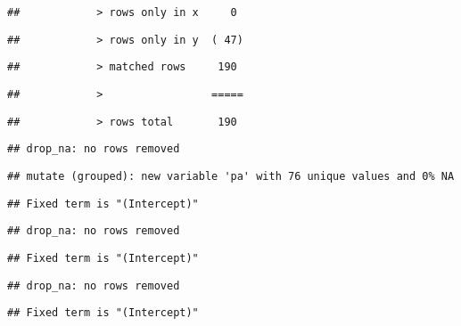 \documentclass[
]{article}
\newenvironment{Shaded}{\begin{snugshade}}{\end{snugshade}}
\newcommand{\DataTypeTok}[1]{\textcolor[rgb]{0.13,0.29,0.53}{#1}}
\newcommand{\KeywordTok}[1]{\textcolor[rgb]{0.13,0.29,0.53}{\textbf{#1}}}
\newcommand{\NormalTok}[1]{#1}
\newcommand{\OperatorTok}[1]{\textcolor[rgb]{0.81,0.36,0.00}{\textbf{#1}}}
\newcommand{\StringTok}[1]{\textcolor[rgb]{0.31,0.60,0.02}{#1}}
\begin{document}
\begin{verbatim}
##            > rows only in x     0
\end{verbatim}

\begin{verbatim}
##            > rows only in y  ( 47)
\end{verbatim}

\begin{verbatim}
##            > matched rows     190
\end{verbatim}

\begin{verbatim}
##            >                 =====
\end{verbatim}

\begin{verbatim}
##            > rows total       190
\end{verbatim}

\begin{verbatim}
## drop_na: no rows removed
\end{verbatim}

\begin{verbatim}
## mutate (grouped): new variable 'pa' with 76 unique values and 0% NA
\end{verbatim}

\begin{Shaded}
\end{Shaded}

\begin{verbatim}
## Fixed term is "(Intercept)"
\end{verbatim}

\begin{verbatim}
## drop_na: no rows removed
\end{verbatim}

\begin{verbatim}
## Fixed term is "(Intercept)"
\end{verbatim}

\begin{verbatim}
## drop_na: no rows removed
\end{verbatim}

\begin{verbatim}
## Fixed term is "(Intercept)"
\end{verbatim}
\end{document}
